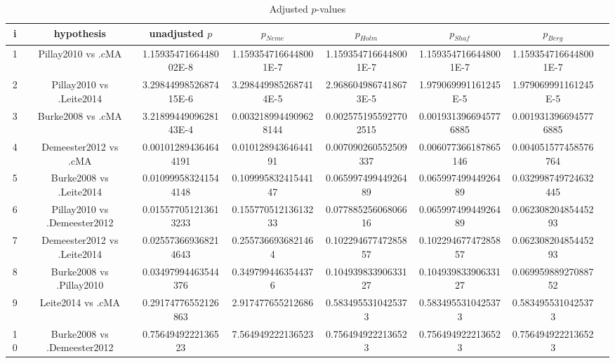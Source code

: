 \documentclass[a4paper,10pt]{article}
\begin{document}
\begin{landscape}
\begin{table}[!htp]
\centering\tiny
\caption{Adjusted $p$-values}
\begin{tabular}{cccccccc}
i&hypothesis&unadjusted $p$&$p_{Neme}$&$p_{Holm}$&$p_{Shaf}$&$p_{Berg}$\\
\hline
1&Pillay2010 vs .cMA&1.1593547166448002E-8&1.1593547166448001E-7&1.1593547166448001E-7&1.1593547166448001E-7&1.1593547166448001E-7\\
2&Pillay2010 vs .Leite2014&3.2984499852687415E-6&3.2984499852687414E-5&2.9686049867418673E-5&1.979069991161245E-5&1.979069991161245E-5\\
3&Burke2008 vs .cMA&3.2189944909628143E-4&0.0032189944909628144&0.0025751955927702515&0.0019313966945776885&0.0019313966945776885\\
4&Demeester2012 vs .cMA&0.001012894364644191&0.01012894364644191&0.007090260552509337&0.006077366187865146&0.004051577458576764\\
5&Burke2008 vs .Leite2014&0.010999583241544148&0.10999583241544147&0.06599749944926489&0.06599749944926489&0.032998749724632445\\
6&Pillay2010 vs .Demeester2012&0.015577051213613233&0.15577051213613233&0.07788525606806616&0.06599749944926489&0.06230820485445293\\
7&Demeester2012 vs .Leite2014&0.025573669368214643&0.2557366936821464&0.10229467747285857&0.10229467747285857&0.06230820485445293\\
8&Burke2008 vs .Pillay2010&0.03497994463544376&0.3497994463544376&0.10493983390633127&0.10493983390633127&0.06995988927088752\\
9&Leite2014 vs .cMA&0.29174776552126863&2.917477655212686&0.5834955310425373&0.5834955310425373&0.5834955310425373\\
10&Burke2008 vs .Demeester2012&0.7564949222136523&7.564949222136523&0.7564949222136523&0.7564949222136523&0.7564949222136523\\
\hline
\end{tabular}
\end{table}

\end{landscape}
\end{document}
